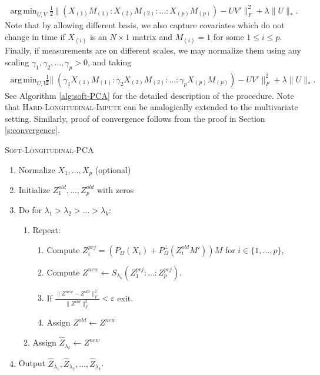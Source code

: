 \documentclass[preprint]{imsart}
\numberwithin{equation}{section}
\theoremstyle{plain}
\DeclareMathOperator*{\argmin}{arg\,min}
\begin{document}
\begin{align*}%
\argmin_{U,V} \frac{1}{2} &\| (X_{(1)}M_{(1)}:X_{(2)}M_{(2)}:...:X_{(p)}M_{(p)}) - U V' \|_F^2 + \lambda\|U\|_*.
\end{align*}
Note that by allowing different basis, we also capture covariates which do not change in time if $X_{(i)}$ is an $N\times 1$ matrix and $M_{(i)} = 1$ for some $1 \leq i \leq p$.
Finally, if measurements are on different scales, we may normalize them using any scaling $\gamma_1, \gamma_2,..., \gamma_p > 0$, and taking
\begin{align*}%
\argmin_{U,V} \frac{1}{2} &\| (\gamma_1 X_{(1)}M_{(1)}:\gamma_2 X_{(2)}M_{(2)}:...:\gamma_p X_{(p)}M_{(p)}) - U V' \|_F^2 + \lambda\|U\|_*.
\end{align*}
See Algorithm \ref{alg:soft-PCA} for the detailed description of the procedure. Note that \textsc{Hard-Longitudinal-Impute} can be analogically extended to the multivariate setting. Similarly, proof of convergence follows from the proof in Section \ref{s:convergence}.

\begin{algorithm}
\caption{\textsc{Soft-Longitudinal-PCA}\label{alg:soft-PCA}}
\begin{enumerate}
\item Normalize $X_1,...,X_p$ (optional)
\item Initialize $Z^{old}_1,...,Z^{old}_p$ with zeros
\item Do for $\lambda_1 > \lambda_2 > ... > \lambda_k$:
\begin{enumerate}
\item Repeat:
\begin{enumerate}
\item Compute $Z^{prj}_i = (P_\Omega(X_i) + P_\Omega^\perp(Z_i^{old}M'))M$ for $i \in \{1,...,p\}$,
\item Compute $Z^{new} \leftarrow S_{\lambda_k}( Z^{prj}_1 : ... : Z^{prj}_p )$.
\item If $\frac{\|Z^{new} - Z^{old}\|_F^2}{\|Z^{old}\|_F^2} < \varepsilon$ exit.
\item Assign $Z^{old} \leftarrow Z^{new}$
\end{enumerate}
\item Assign $\hat{Z}_{\lambda_k} \leftarrow Z^{new}$
\end{enumerate}
\item Output $\hat{Z}_{\lambda_1}, \hat{Z}_{\lambda_2}, ... , \hat{Z}_{\lambda_k}$.
\end{enumerate}
\end{algorithm}
\end{document}
